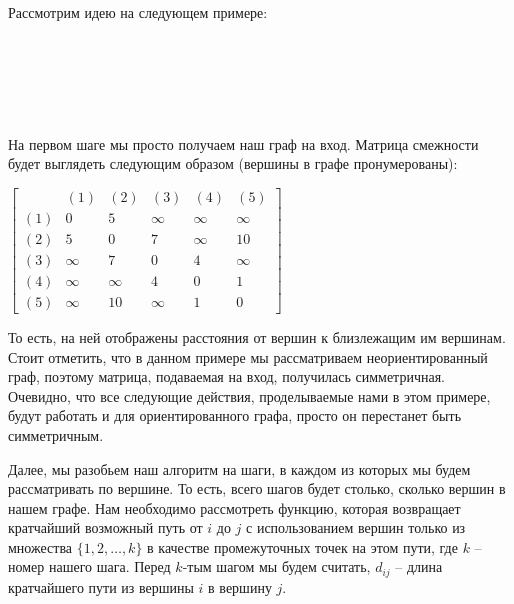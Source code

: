 \documentclass[12pt]{article}
\begin{document}
Рассмотрим идею на следующем примере:
\\
\\
\\
\begin{minipage}[h]{0.59\linewidth}
\end{minipage}
\\
\\
\\
На первом шаге мы просто получаем наш граф на вход. Матрица смежности будет выглядеть следующим образом (вершины в графе пронумерованы):
\begin{center}
$\begin{bmatrix}
   & (1)& (2)& (3)& (4)& (5)\\
  (1)& 0& 5& \infty& \infty& \infty\\
  (2)& 5& 0& 7& \infty& 10\\
  (3)& \infty& 7& 0& 4& \infty\\
  (4)& \infty& \infty& 4& 0& 1\\
  (5)& \infty& 10& \infty& 1& 0 
\end{bmatrix}$
\end{center}
То есть, на ней отображены расстояния от вершин к близлежащим им вершинам. Стоит отметить, что в данном примере
 мы рассматриваем неориентированный граф, поэтому матрица, 
 подаваемая на вход, получилась симметричная. Очевидно, что все
  следующие действия, проделываемые нами в этом примере, будут
   работать и для ориентированного графа, просто он перестанет быть симметричным.
   
Далее, мы разобьем наш алгоритм на шаги, в каждом из которых мы будем рассматривать по вершине. То есть, всего шагов будет столько, сколько вершин в нашем графе. 
Нам необходимо рассмотреть функцию, которая возвращает кратчайший возможный путь от $i$ до $j$ с  использованием вершин только из множества $\{1,2,\ldots ,k\}$ в качестве промежуточных точек на этом пути, где $k$ -- номер нашего шага. 
Перед $k$-тым шагом мы будем считать, $d_{ij}$ -- длина кратчайшего пути из вершины $i$ в вершину $j$.
\end{document}
